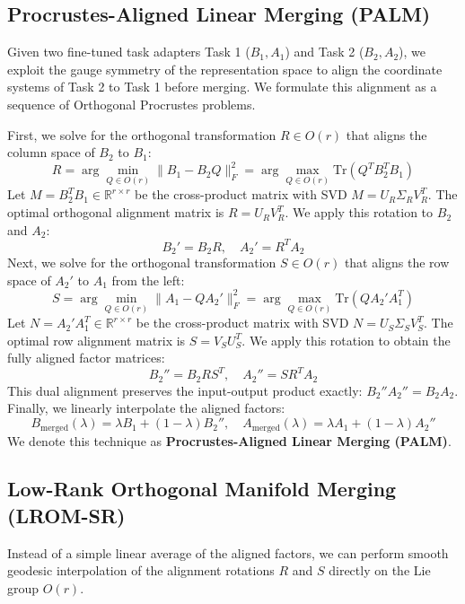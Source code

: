 \documentclass{article}
\theoremstyle{plain}
\theoremstyle{definition}
\theoremstyle{remark}
\begin{document}
\subsection{Procrustes-Aligned Linear Merging (PALM)}
Given two fine-tuned task adapters Task 1 ($B_1, A_1$) and Task 2 ($B_2, A_2$), we exploit the gauge symmetry of the representation space to align the coordinate systems of Task 2 to Task 1 before merging. We formulate this alignment as a sequence of Orthogonal Procrustes problems.

First, we solve for the orthogonal transformation $R \in O(r)$ that aligns the column space of $B_2$ to $B_1$:
\begin{equation}
R = \arg\min_{Q \in O(r)} \|B_1 - B_2 Q\|_F^2 = \arg\max_{Q \in O(r)} \text{Tr}(Q^T B_2^T B_1)
\end{equation}
Let $M = B_2^T B_1 \in \mathbb{R}^{r \times r}$ be the cross-product matrix with SVD $M = U_R \Sigma_R V_R^T$. The optimal orthogonal alignment matrix is $R = U_R V_R^T$. We apply this rotation to $B_2$ and $A_2$:
\begin{equation}
B_2' = B_2 R, \quad A_2' = R^T A_2
\end{equation}
Next, we solve for the orthogonal transformation $S \in O(r)$ that aligns the row space of $A_2'$ to $A_1$ from the left:
\begin{equation}
S = \arg\min_{Q \in O(r)} \|A_1 - Q A_2'\|_F^2 = \arg\max_{Q \in O(r)} \text{Tr}(Q A_2' A_1^T)
\end{equation}
Let $N = A_2' A_1^T \in \mathbb{R}^{r \times r}$ be the cross-product matrix with SVD $N = U_S \Sigma_S V_S^T$. The optimal row alignment matrix is $S = V_S U_S^T$. We apply this rotation to obtain the fully aligned factor matrices:
\begin{equation}
B_2'' = B_2 R S^T, \quad A_2'' = S R^T A_2
\end{equation}
This dual alignment preserves the input-output product exactly: $B_2'' A_2'' = B_2 A_2$. Finally, we linearly interpolate the aligned factors:
\begin{equation}
B_{\text{merged}}(\lambda) = \lambda B_1 + (1-\lambda) B_2'', \quad A_{\text{merged}}(\lambda) = \lambda A_1 + (1-\lambda) A_2''
\end{equation}
We denote this technique as \textbf{Procrustes-Aligned Linear Merging (PALM)}.

\subsection{Low-Rank Orthogonal Manifold Merging (LROM-SR)}
Instead of a simple linear average of the aligned factors, we can perform smooth geodesic interpolation of the alignment rotations $R$ and $S$ directly on the Lie group $O(r)$.
\end{document}
